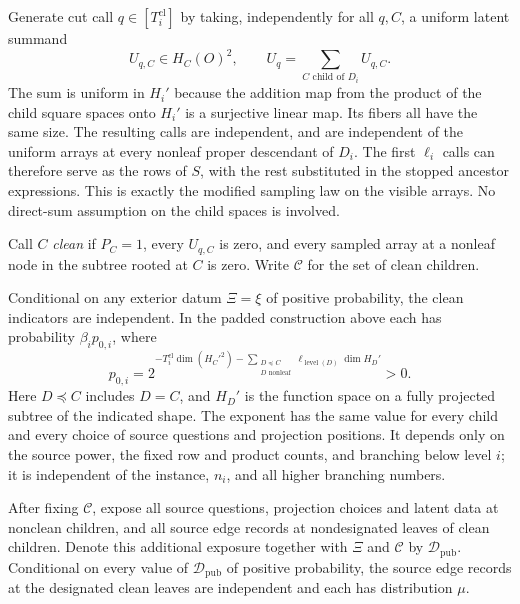 Generate cut call $q\in[T_i^{\mathrm{cl}}]$ by taking, independently for all
$q,C$, a uniform latent summand
\[
 U_{q,C}\in H_C(O)^2,
 \qquad U_q=\sum_{C\text{ child of }D_i}U_{q,C}.
\]
The sum is uniform in $H_i'$ because the addition map from the
product of the child square spaces onto $H_i'$ is a surjective linear
map.  Its fibers all have the same size.  The resulting calls are
independent, and are independent of the uniform arrays at every
nonleaf proper descendant of $D_i$.  The first $\ell_i$ calls can
therefore serve as the rows of $S$, with the rest substituted in the
stopped ancestor expressions.  This is exactly the modified sampling
law on the visible arrays.  No direct-sum assumption on the child
spaces is involved.

Call $C$ \emph{clean} if $P_C=1$, every $U_{q,C}$ is zero, and every
sampled array at a nonleaf node in the subtree rooted at $C$ is zero.
Write $\mathcal C$ for the set of clean children.

\begin{lemma}
\label{lem:clean-law}
Conditional on any exterior datum $\Xi=\xi$ of positive probability,
the clean indicators are independent.  In the padded construction
above each has probability $\beta_i p_{0,i}$, where
\begin{equation}
 p_{0,i}=
 2^{-T_i^{\mathrm{cl}}\dim(H_C'^2)
       -\displaystyle\sum_{\substack{D\preceq C\\D\text{ nonleaf}}}
           \ell_{\operatorname{level}(D)}\dim H_D'}>0.
 \label{eq:clean-zero-probability}
\end{equation}
Here $D\preceq C$ includes $D=C$, and $H_D'$ is the function space
on a fully projected subtree of the indicated shape.  The exponent
has the same value for every child and every choice of source
questions and projection positions.  It depends only on the source
power, the fixed row and product counts, and branching below level
$i$; it is independent of the instance, $n_i$, and all higher
branching numbers.

After fixing $\mathcal C$, expose all source questions, projection
choices and latent data at nonclean children, and all source edge
records at nondesignated leaves of clean children.  Denote this
additional exposure together with $\Xi$ and $\mathcal C$ by
$\mathcal D_{\mathrm{pub}}$.  Conditional on every value of $\mathcal D_{\mathrm{pub}}$ of positive
probability, the source edge records at the designated clean leaves
are independent and each has distribution $\mu$.
\end{lemma}

